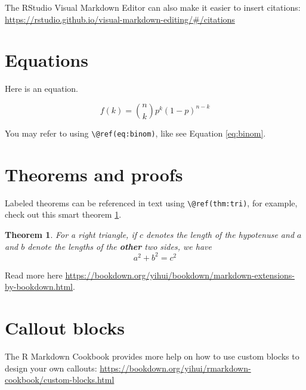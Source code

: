 \documentclass[
]{book}
\newtheorem{theorem}{Theorem}[chapter]
\theoremstyle{definition}
\theoremstyle{definition}
\theoremstyle{definition}
\theoremstyle{definition}
\theoremstyle{remark}
\begin{document}
The RStudio Visual Markdown Editor can also make it easier to insert citations: \url{https://rstudio.github.io/visual-markdown-editing/\#/citations}

\hypertarget{equations}{%
\section{Equations}\label{equations}}

Here is an equation.

\begin{equation} 
  f\left(k\right) = \binom{n}{k} p^k\left(1-p\right)^{n-k}
  \label{eq:binom}
\end{equation}

You may refer to using \texttt{\textbackslash{}@ref(eq:binom)}, like see Equation \eqref{eq:binom}.

\hypertarget{theorems-and-proofs}{%
\section{Theorems and proofs}\label{theorems-and-proofs}}

Labeled theorems can be referenced in text using \texttt{\textbackslash{}@ref(thm:tri)}, for example, check out this smart theorem \ref{thm:tri}.

\begin{theorem}
\protect\hypertarget{thm:tri}{}\label{thm:tri}For a right triangle, if \(c\) denotes the \emph{length} of the hypotenuse
and \(a\) and \(b\) denote the lengths of the \textbf{other} two sides, we have
\[a^2 + b^2 = c^2\]
\end{theorem}

Read more here \url{https://bookdown.org/yihui/bookdown/markdown-extensions-by-bookdown.html}.

\hypertarget{callout-blocks}{%
\section{Callout blocks}\label{callout-blocks}}

The R Markdown Cookbook provides more help on how to use custom blocks to design your own callouts: \url{https://bookdown.org/yihui/rmarkdown-cookbook/custom-blocks.html}
\end{document}
